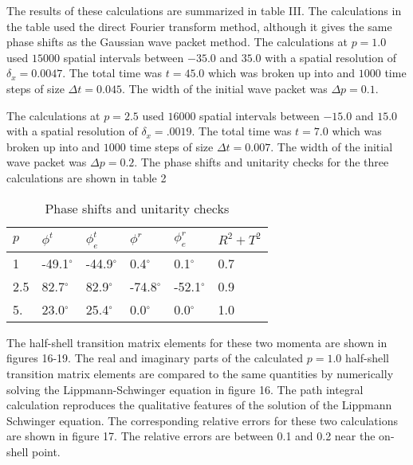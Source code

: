 \documentclass[aps,prc,reprint,noshowpacs,groupedaddress,onecolumn]{revtex4}
\begin{document}
The results of these calculations are summarized in table III.  The
calculations in the table used the direct Fourier transform method,
although it gives the same phase shifts as the Gaussian wave packet
method.  The calculations at $p=1.0$ used $15000$ spatial intervals
between $-35.0$ and $35.0$ with a spatial resolution of
$\delta_x=0.0047$.  The total time was $t=45.0$ which was broken up
into and $1000$ time steps of size $\Delta t=0.045$.  The width of the
initial wave packet was $\Delta p= 0.1$.

The calculations at $p=2.5$ used $16000$
spatial intervals between $-15.0$ and $15.0$ with a spatial resolution of
$\delta_x=.0019$.  The total time was $t=7.0$ which was broken up into
and $1000$ time steps of size $\Delta t= 0.007$.  The width of the
initial wave packet was $\Delta p= 0.2$.  The phase shifts and unitarity
checks for the three calculations are shown in table 2

\begin{table}
\caption{Phase shifts and unitarity checks}
\begin{tabular}{llllll}
\hline
\hline
$p$ & $\phi^t$ & $\phi^t_e$ & $\phi^r$ & $\phi^r_e$ & $R^2+T^2$ \\
\hline
1   & -49.1$^{\circ}$ & -44.9$^{\circ}$  & 0.4$^{\circ}$ & 0.1$^{\circ}$ & 0.7\\
2.5 & 82.7$^{\circ}$ &82.9$^{\circ}$    & -74.8$^{\circ}$  & -52.1$^{\circ}$ & 0.9\\ 
5.  & 23.0$^{\circ}$ & 25.4$^{\circ}$ & 0.0$^{\circ}$ & 0.0$^{\circ}$ & 1.0 \\
\hline
\end{tabular}
\end{table}

The half-shell transition matrix elements for these two momenta are
shown in figures 16-19.  The real and imaginary parts of the
calculated $p=1.0$ half-shell transition matrix elements are compared
to the same quantities by numerically solving the Lippmann-Schwinger
equation in figure 16.  The path integral calculation reproduces the
qualitative features of the solution of the Lippmann Schwinger
equation.  The corresponding relative errors for these two
calculations are shown in figure 17.  The relative errors are between
0.1 and 0.2 near the on-shell point.
\end{document}
